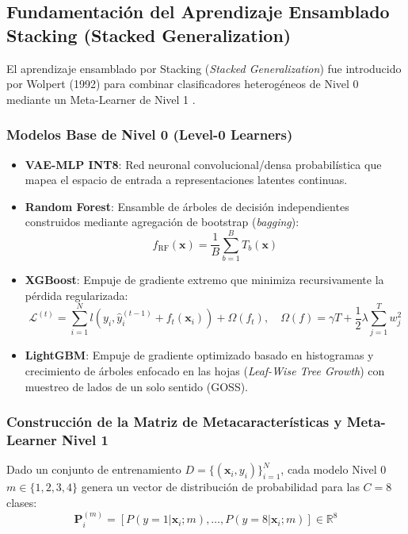\subsection{Fundamentación del Aprendizaje Ensamblado Stacking (Stacked Generalization)}

El aprendizaje ensamblado por Stacking (\textit{Stacked Generalization}) fue introducido por Wolpert (1992) para combinar clasificadores heterogéneos de Nivel 0 mediante un Meta-Learner de Nivel 1 \citep{kumar2023}.

\subsubsection{Modelos Base de Nivel 0 (Level-0 Learners)}
\begin{itemize}
    \item \textbf{VAE-MLP INT8}: Red neuronal convolucional/densa probabilística que mapea el espacio de entrada a representaciones latentes continuas.
    \item \textbf{Random Forest}: Ensamble de árboles de decisión independientes construidos mediante agregación de bootstrap (\textit{bagging}):
    \begin{equation}
    f_{\text{RF}}(\mathbf{x}) = \frac{1}{B} \sum_{b=1}^B T_b(\mathbf{x})
    \end{equation}
    \item \textbf{XGBoost}: Empuje de gradiente extremo que minimiza recursivamente la pérdida regularizada:
    \begin{equation}
    \mathcal{L}^{(t)} = \sum_{i=1}^N l\left(y_i, \hat{y}_i^{(t-1)} + f_t(\mathbf{x}_i)\right) + \Omega(f_t), \quad \Omega(f) = \gamma T + \frac{1}{2}\lambda \sum_{j=1}^T w_j^2
    \end{equation}
    \item \textbf{LightGBM}: Empuje de gradiente optimizado basado en histogramas y crecimiento de árboles enfocado en las hojas (\textit{Leaf-Wise Tree Growth}) con muestreo de lados de un solo sentido (GOSS).
\end{itemize}

\subsubsection{Construcción de la Matriz de Metacaracterísticas y Meta-Learner Nivel 1}
Dado un conjunto de entrenamiento $D = \{(\mathbf{x}_i, y_i)\}_{i=1}^N$, cada modelo Nivel 0 $m \in \{1, 2, 3, 4\}$ genera un vector de distribución de probabilidad para las $C=8$ clases:
\begin{equation}
\mathbf{P}_i^{(m)} = \left[ P(y=1|\mathbf{x}_i; m), \dots, P(y=8|\mathbf{x}_i; m) \right] \in \mathbb{R}^8
\end{equation}

